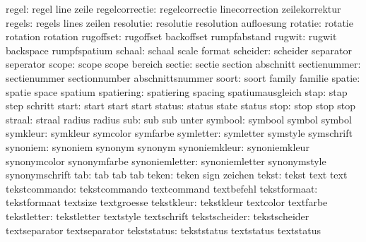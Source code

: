               regel:  regel                line                zeile
     regelcorrectie:  regelcorrectie       linecorrection      zeilekorrektur
             regels:  regels               lines               zeilen
          resolutie:  resolutie            resolution          aufloesung
            rotatie:  rotatie              rotation            rotation
          rugoffset:  rugoffset            backoffset          rumpfabstand
             rugwit:  rugwit               backspace           rumpfspatium
             schaal:  schaal               scale               format
           scheider:  scheider             separator           seperator
              scope:  scope                scope               bereich
             sectie:  sectie               section             abschnitt
       sectienummer:  sectienummer         sectionnumber       abschnittsnummer
              soort:  soort                family              familie
             spatie:  spatie               space               spatium
         spatiering:  spatiering           spacing             spatiumausgleich
               stap:  stap                 step                schritt
              start:  start                start               start
             status:  status               state               status
               stop:  stop                 stop                stop
             straal:  straal               radius              radius
                sub:  sub                  sub                 unter
            symbool:  symbool              symbol              symbol
           symkleur:  symkleur             symcolor            symfarbe
          symletter:  symletter            symstyle            symschrift
           synoniem:  synoniem             synonym             synonym
      synoniemkleur:  synoniemkleur        synonymcolor        synonymfarbe
     synoniemletter:  synoniemletter       synonymstyle        synonymschrift
                tab:  tab                  tab                 tab
              teken:  teken                sign                zeichen
              tekst:  tekst                text                text
      tekstcommando:  tekstcommando        textcommand         textbefehl
       tekstformaat:  tekstformaat         textsize            textgroesse
         tekstkleur:  tekstkleur           textcolor           textfarbe
        tekstletter:  tekstletter          textstyle           textschrift
      tekstscheider:  tekstscheider        textseparator       textseparator
        tekststatus:  tekststatus          textstatus          textstatus
